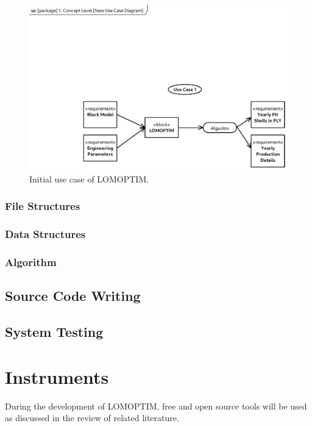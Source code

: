 \documentclass[12pt]{report}
\begin{document}
\begin{figure}[p]
    \centering
    \includegraphics[clip, trim=0 0 0 12mm, width=\linewidth]{img/usecase.pdf}
    \caption{Initial use case of LOMOPTIM.}
    \label{fig:usecase}
\end{figure}

\subsubsection{File Structures}

\subsubsection{Data Structures}

\subsubsection{Algorithm}

\subsection{Source Code Writing}

\subsection{System Testing}

\section{Instruments}

During the development of LOMOPTIM, free and open source tools will be used as discussed in the review of related literature.
\end{document}
